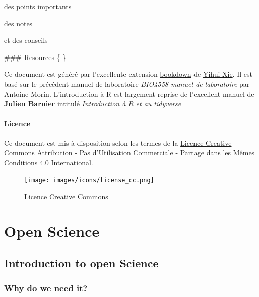 \documentclass[
  12pt,
]{book}
\makeatletter
\newenvironment{kframe}{%
\medskip{}
\setlength{\fboxsep}{.8em}
\def\at@end@of@kframe{}%
\ifinner\ifhmode%
 \def\at@end@of@kframe{\end{minipage}}%
 \begin{minipage}{\columnwidth}%
\fi\fi%
\def\FrameCommand##1{\hskip\@totalleftmargin \hskip-\fboxsep
\colorbox{incolor}{##1}\hskip-\fboxsep
    \hskip-\linewidth \hskip-\@totalleftmargin \hskip\columnwidth}%
\MakeFramed {\advance\hsize-\width
  \@totalleftmargin\z@ \linewidth\hsize
  \@setminipage}}%
{\par\unskip\endMakeFramed%
\at@end@of@kframe}
\newenvironment{rmdblock}[1]
 {
 \begin{itemize}
 \renewcommand{\labelitemi}{
   \raisebox{-.7\height}[0pt][0pt]{
     {\setkeys{Gin}{width=3em,keepaspectratio}\texttt{[image: images/icons/\#1]}}
   }
 }
 \begin{kframe}
 \setlength{\fboxsep}{1em}
 \item
 }
 {
 \end{kframe}
 \end{itemize}
 }
\newenvironment{rmdnote}
  {\begin{rmdblock}{note}}
  {\end{rmdblock}}
\newenvironment{rmdimportant}
  {\begin{rmdblock}{important}}
  {\end{rmdblock}}
\newenvironment{rmdtip}
  {\begin{rmdblock}{tip}}
  {\end{rmdblock}}
\makeatother
\begin{document}
\begin{rmdimportant}
des points importants
\end{rmdimportant}

\begin{rmdnote}
des notes
\end{rmdnote}

\begin{rmdtip}
et des conseils
\end{rmdtip}
\#\#\# Resources \{-\}

Ce document est généré par l'excellente extension \href{https://bookdown.org/}{bookdown} de \href{https://yihui.name/}{Yihui Xie}. Il est basé sur le précédent manuel de laboratoire \emph{BIO4558 manuel de laboratoire} par Antoine Morin. L'introduction à R est largement reprise de l'excellent manuel de \textbf{Julien Barnier} intitulé \href{https://juba.github.io/tidyverse/}{\emph{Introduction à R et au tidyverse}}

\hypertarget{licence}{%
\subsection*{Licence}\label{licence}}

Ce document est mis à disposition selon les termes de la \href{http://creativecommons.org/licenses/by-nc-sa/4.0/}{Licence Creative Commons Attribution - Pas d'Utilisation Commerciale - Partage dans les Mêmes Conditions 4.0 International}.

\begin{figure}
\centering
\texttt{[image: images/icons/license\_cc.png]}
\caption{Licence Creative Commons}
\end{figure}

\hypertarget{part-open-science}{%
\part{Open Science}\label{part-open-science}}

\hypertarget{introduction-to-open-science}{%
\chapter{Introduction to open Science}\label{introduction-to-open-science}}

\hypertarget{why-do-we-need-it}{%
\section{Why do we need it?}\label{why-do-we-need-it}}
\end{document}
